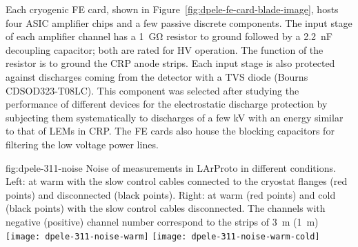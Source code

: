 Each cryogenic FE card, shown in Figure~\ref{fig:dpele-fe-card-blade-image}, hosts four ASIC amplifier chips and a few passive discrete components. The input stage of each amplifier channel has a \SI{1}{\giga\ohm} resistor to ground followed by a \SI{2.2}{\nano\farad} decoupling capacitor; both are rated for HV operation. The function of the resistor is to ground the CRP anode strips. Each input stage is also protected against discharges coming from the detector with a TVS diode (Bourns CDSOD323-T08LC). This component was selected after studying the performance of different devices for the electrostatic discharge protection by subjecting them systematically to discharges of a few kV with an energy similar to that of LEMs in CRP. The FE cards also house the blocking capacitors for filtering the low voltage power lines.

\begin{dunefigure}{fig:dpele-311-noise}
{Noise of measurements in LArProto in different conditions. Left: at warm with the slow control cables connected to the cryostat flanges (red points) and disconnected (black points). Right: at warm (red points) and cold (black points) with the slow control cables disconnected. The channels with negative (positive) channel number correspond to the strips of \SI{3}{\meter} (\SI{1}{\meter})}
\texttt{[image: dpele-311-noise-warm]}
\texttt{[image: dpele-311-noise-warm-cold]}
\end{dunefigure}


